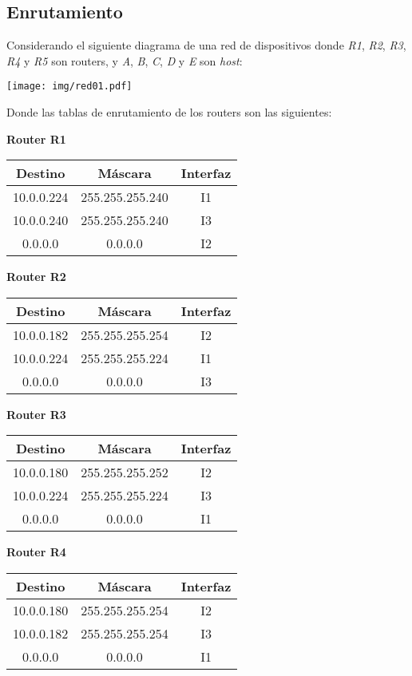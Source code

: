\documentclass[12pt]{article}
\begin{document}
\subsection*{Enrutamiento}

Considerando el siguiente diagrama de una red de dispositivos donde \emph{R1},
\emph{R2}, \emph{R3}, \emph{R4} y \emph{R5} son routers, y \emph{A}, \emph{B},
\emph{C}, \emph{D} y \emph{E} son \emph{host}:

    \texttt{[image: img/red01.pdf]}

Donde las tablas de enrutamiento de los routers son las siguientes:

\textbf{Router R1}

\begin{tabular}{|c|c|c|}
    \hline
    Destino & Máscara & Interfaz \\
    \hline
    10.0.0.224 & 255.255.255.240 & I1 \\
    \hline
    10.0.0.240 & 255.255.255.240 & I3 \\
    \hline
    0.0.0.0 & 0.0.0.0 & I2 \\
    \hline
\end{tabular}

\textbf{Router R2}

\begin{tabular}{|c|c|c|}
    \hline
    Destino & Máscara & Interfaz \\
    \hline
    10.0.0.182 & 255.255.255.254 & I2 \\
    \hline
    10.0.0.224 & 255.255.255.224 & I1 \\
    \hline
    0.0.0.0 & 0.0.0.0 & I3 \\
    \hline
\end{tabular}

\textbf{Router R3}

\begin{tabular}{|c|c|c|}
    \hline
    Destino & Máscara & Interfaz \\
    \hline
    10.0.0.180 & 255.255.255.252 & I2 \\
    \hline
    10.0.0.224 & 255.255.255.224 & I3 \\
    \hline
    0.0.0.0 & 0.0.0.0 & I1 \\
    \hline
\end{tabular}

\textbf{Router R4}

\begin{tabular}{|c|c|c|}
    \hline
    Destino & Máscara & Interfaz \\
    \hline
    10.0.0.180 & 255.255.255.254 & I2 \\
    \hline
    10.0.0.182 & 255.255.255.254 & I3 \\
    \hline
    0.0.0.0 & 0.0.0.0 & I1 \\
    \hline
\end{tabular}
\end{document}
